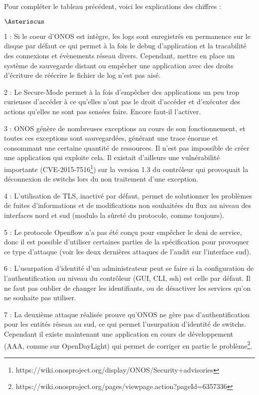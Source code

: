 Pour compléter le tableau précédent, voici les explications des chiffres :
\begin{list}{$\Asteriscus$}{}
\item 1 : Si le coeur d'ONOS est intègre, les logs sont enregistrés en permanence sur le disque par défaut ce qui permet à la fois le debug d'application et la tracabilité des connexions et évènements réseau divers. Cependant, mettre en place un système de sauvegarde distant ou empêcher une application avec des droits d'écriture de réécrire le fichier de log n'est pas aisé.
\item 2 : Le Secure-Mode permet à la fois d'empêcher des applications un peu trop curieuses d'accéder à ce qu'elles n'ont pas le droit d'accéder et d'exécuter des actions qu'elles ne sont pas sensées faire. Encore faut-il l'activer.
\item 3 : ONOS génère de nombreuses exceptions au cours de son fonctionnement, et toutes ces exceptions sont sauvegardées, générant une trace énorme et consommant une certaine quantité de ressources. Il n'est pas impossible de créer une application qui exploite cela. Il existait d'ailleurs une vulnérabilité importante (CVE-2015-7516\footnote{https://wiki.onosproject.org/display/ONOS/Security+advisories}) sur la version 1.3 du contrôleur qui provoquait la déconnexion de switchs lors du non traitement d'une exception.
\item 4 : L'utilisation de TLS, inactivé par défaut, permet de solutionner les problèmes de fuites d'informations et de modifications non souhaitées du flux au niveau des interfaces nord et sud (modulo la sûreté du protocole, comme toujours).
\item 5 : Le protocole Openflow n'a pas été conçu pour empêcher le deni de service, donc il est possible d'utiliser certaines parties de la spécification pour provoquer ce type d'attaque (voir les deux dernières attaques de l'audit sur l'interface sud).
\item 6 : L'usurpation d'identité d'un administrateur peut se faire si la configuration de l'authentification au niveau du contrôleur (GUI, CLI, ssh) est celle par défaut. Il ne faut pas oublier de changer les identifiants, ou de désactiver les services qu'on ne souhaite pas utiliser.
\item 7 : La deuxième attaque réalisée prouve qu'ONOS ne gère pas d'authentification pour les entités réseau au sud, ce qui permet l'usurpation d'identité de switchs. Cependant il existe maintenant une application en cours de développement (AAA, comme sur OpenDayLight) qui permet de corriger en partie le problème\footnote{https://wiki.onosproject.org/pages/viewpage.action?pageId=6357336}.
\end{list}